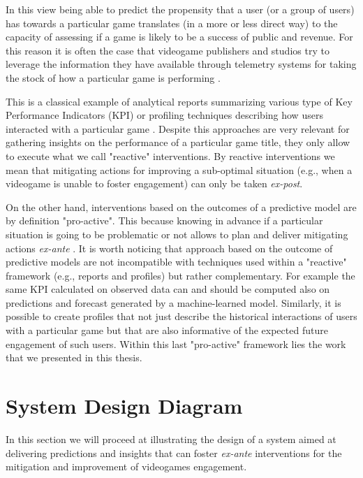 In this view being able to predict the propensity that a user (or a group of users) has towards a particular game translates (in a more or less direct way) to the capacity of assessing if a game is likely to be a success of public and revenue. For this reason it is often the case that videogame publishers and studios try to leverage the information they have available through telemetry systems for taking the stock of how a particular game is performing \cite{el2016game}. 

This is a classical example of analytical reports summarizing various type of Key Performance Indicators (KPI)\cite{el2016game} or profiling techniques describing how users interacted with a particular game \cite{el2016game}. Despite this approaches are very relevant for gathering insights on the performance of a particular game title, they only allow to execute what we call "reactive" interventions. By reactive interventions we mean that mitigating actions for improving a sub-optimal situation (e.g., when a videogame is unable to foster engagement) can only be taken \textit{ex-post}.

On the other hand, interventions based on the outcomes of a predictive model are by definition "pro-active". This because knowing in advance if a particular situation is going to be problematic or not allows to plan and deliver mitigating actions \textit{ex-ante} \cite{el2016game, el2021game}. It is worth noticing that approach based on the outcome of predictive models are not incompatible with techniques used within a "reactive" framework (e.g., reports and profiles) but rather complementary. For example the same KPI calculated on observed data can and should be computed also on predictions and forecast generated by a machine-learned model. Similarly, it is possible to create profiles that not just describe the historical interactions of users with a particular game but that are also informative of the expected future engagement of such users. Within this last "pro-active" framework lies the work that we presented in this thesis. 

\section{System Design Diagram}
\label{pipeline}

In this section we will proceed at illustrating the design of a system aimed at delivering predictions and insights that can foster \textit{ex-ante} interventions for the mitigation and improvement of videogames engagement. 

